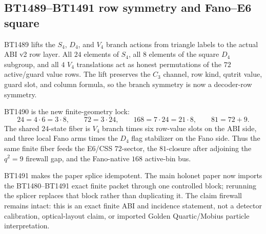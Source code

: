 \subsection{BT1489--BT1491 row symmetry and Fano--E6 square}
\label{sec:bt1489-bt1491-row-fano-e6-square}

BT1489 lifts the \(S_4\), \(D_4\), and \(V_4\) branch actions from triangle
labels to the actual ABI v2 row layer.  All \(24\) elements of \(S_4\), all
\(8\) elements of the square \(D_4\) subgroup, and all \(4\) \(V_4\)
translations act as honest permutations of the \(72\) active/guard value rows.
The lift preserves the \(C_3\) channel, row kind, qutrit value, guard slot, and
column formula, so the branch symmetry is now a decoder-row symmetry.

BT1490 is the new finite-geometry lock:
\[
24 = 4\cdot6 = 3\cdot8,\qquad
72 = 3\cdot24,\qquad
168 = 7\cdot24 = 21\cdot8,\qquad
81 = 72+9.
\]
The shared \(24\)-state fiber is \(V_4\) branch times six row-value slots on the
ABI side, and three local Fano arms times the \(D_4\) flag stabilizer on the
Fano side.  Thus the same finite fiber feeds the E6/CSS \(72\)-sector, the
\(81\)-closure after adjoining the \(q^2=9\) firewall gap, and the Fano-native
\(168\) active-bin bus.

BT1491 makes the paper splice idempotent.  The main holonet paper now imports
the BT1480--BT1491 exact finite packet through one controlled block; rerunning
the splicer replaces that block rather than duplicating it.  The claim firewall
remains intact: this is an exact finite ABI and incidence statement, not a
detector calibration, optical-layout claim, or imported Golden Quartic/Mobius
particle interpretation.
